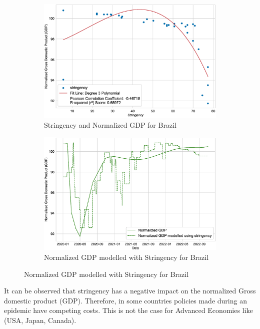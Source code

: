 \documentclass[tikz,fleqn,12pt]{wlscirep}
\begin{document}
\begin{figure}[H]
  \begin{subfigure}[t]{0.48\textwidth}
    \centering
    \includegraphics[width=\linewidth]{images/stringency_vs_gdp_BRA.eps}
    \caption{Stringency and Normalized GDP for Brazil}
  \end{subfigure}
  \label{fig:stringency_vs_gdp_BRA}
  \hfill
  \begin{subfigure}[t]{0.48\textwidth}
    \centering
    \includegraphics[width=\linewidth]{images/gdp_modelled_with_stringency_BRA.eps}
    \caption{Normalized GDP modelled with Stringency for Brazil}
  \end{subfigure}
  \label{fig:gdp_modelled_with_stringency_BRA}
\end{figure}

It can be observed that stringency has a negative impact on the normalized Gross domestic product (GDP). Therefore, in some countries policies made during an epidemic have competing costs. This is not the case for Advanced Economies like (USA, Japan, Canada).
\end{document}
